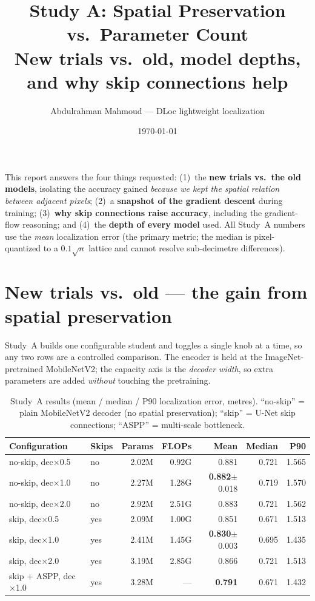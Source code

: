 \documentclass[11pt]{article}
\title{\textbf{Study A: Spatial Preservation vs.\ Parameter Count}\\[2pt]
\large New trials vs.\ old, model depths, and why skip connections help}
\author{Abdulrahman Mahmoud --- DLoc lightweight localization}
\date{\today}
\begin{document}
\maketitle

\noindent This report answers the four things requested: (1)~the \textbf{new
trials vs.\ the old models}, isolating the accuracy gained \emph{because we kept
the spatial relation between adjacent pixels}; (2)~a \textbf{snapshot of the
gradient descent} during training; (3)~\textbf{why skip connections raise
accuracy}, including the gradient-flow reasoning; and (4)~the \textbf{depth of
every model} used. All Study~A numbers use the \emph{mean} localization error
(the primary metric; the median is pixel-quantized to a $0.1\sqrt{n}$ lattice
and cannot resolve sub-decimetre differences).

\section{New trials vs.\ old --- the gain from spatial preservation}

Study~A builds one configurable student and toggles a single knob at a time, so
any two rows are a controlled comparison. The encoder is held at the
ImageNet-pretrained MobileNetV2; the capacity axis is the \emph{decoder width},
so extra parameters are added \emph{without} touching the pretraining.

\begin{table}[h]
\centering
\caption{Study~A results (mean / median / P90 localization error, metres).
``no-skip'' = plain MobileNetV2 decoder (no spatial preservation); ``skip'' =
U-Net skip connections; ``ASPP'' = multi-scale bottleneck.}
\setlength{\tabcolsep}{5pt}\small
\begin{tabular}{llrrrrr}
\toprule
Configuration & Skips & Params & FLOPs & Mean & Median & P90\\
\midrule
no-skip, dec$\times$0.5 & no  & 2.02M & 0.92G & 0.881 & 0.721 & 1.565\\
no-skip, dec$\times$1.0 & no  & 2.27M & 1.28G & \textbf{0.882}$\pm$0.018 & 0.719 & 1.570\\
no-skip, dec$\times$2.0 & no  & 2.92M & 2.51G & 0.883 & 0.721 & 1.562\\
\midrule
skip, dec$\times$0.5    & yes & 2.09M & 1.00G & 0.851 & 0.671 & 1.513\\
skip, dec$\times$1.0    & yes & 2.41M & 1.45G & \textbf{0.830}$\pm$0.003 & 0.695 & 1.435\\
skip, dec$\times$2.0    & yes & 3.19M & 2.85G & 0.866 & 0.721 & 1.513\\
\midrule
skip + ASPP, dec$\times$1.0 & yes & 3.28M & --- & \textbf{0.791} & 0.671 & 1.432\\
\bottomrule
\end{tabular}
\end{table}
\end{document}
